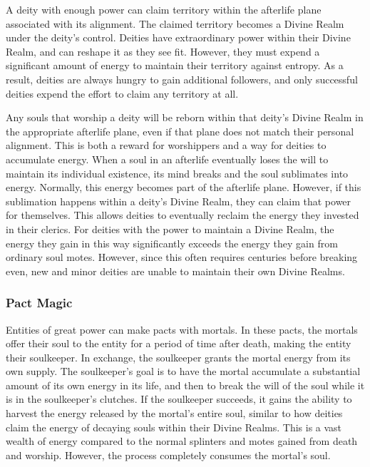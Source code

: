       A deity with enough power can claim territory within the afterlife plane associated with its alignment.
      The claimed territory becomes a Divine Realm under the deity's control.
      Deities have extraordinary power within their Divine Realm, and can reshape it as they see fit.
      However, they must expend a significant amount of energy to maintain their territory against entropy.
      As a result, deities are always hungry to gain additional followers, and only successful deities expend the effort to claim any territory at all.

      Any souls that worship a deity will be reborn within that deity's Divine Realm in the appropriate afterlife plane, even if that plane does not match their personal alignment.
      This is both a reward for worshippers and a way for deities to accumulate energy.
      When a soul in an afterlife eventually loses the will to maintain its individual existence, its mind breaks and the soul sublimates into energy.
      Normally, this energy becomes part of the afterlife plane.
      However, if this sublimation happens within a deity's Divine Realm, they can claim that power for themselves.
      This allows deities to eventually reclaim the energy they invested in their clerics.
      For deities with the power to maintain a Divine Realm, the energy they gain in this way significantly exceeds the energy they gain from ordinary soul motes.
      However, since this often requires centuries before breaking even, new and minor deities are unable to maintain their own Divine Realms.

    \subsubsection{Pact Magic}
      Entities of great power can make pacts with mortals.
      In these pacts, the mortals offer their soul to the entity for a period of time after death, making the entity their soulkeeper.
      In exchange, the soulkeeper grants the mortal energy from its own supply.
      The soulkeeper's goal is to have the mortal accumulate a substantial amount of its own energy in its life, and then to break the will of the soul while it is in the soulkeeper's clutches.
      If the soulkeeper succeeds, it gains the ability to harvest the energy released by the mortal's entire soul, similar to how deities claim the energy of decaying souls  within their Divine Realms.
      This is a vast wealth of energy compared to the normal splinters and motes gained from death and worship.
      However, the process completely consumes the mortal's soul.


